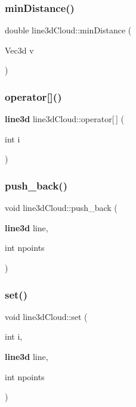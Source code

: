 \subsubsection{min\+Distance()\hspace{0.1cm}{\footnotesize\ttfamily [2/2]}}
{\footnotesize\ttfamily double line3d\+Cloud\+::min\+Distance (\begin{DoxyParamCaption}\item[{Vec3d}]{v }\end{DoxyParamCaption})}

\mbox{\label{classline3d_cloud_a12a7f0d2111300e83e47f9cf9f7a1e12}} 
\subsubsection{operator[]()}
{\footnotesize\ttfamily \textbf{ line3d} line3d\+Cloud\+::operator[$\,$] (\begin{DoxyParamCaption}\item[{int}]{i }\end{DoxyParamCaption})}

\mbox{\label{classline3d_cloud_a79885e87f85b3b14cfd9168f826a6d04}} 
\subsubsection{push\+\_\+back()}
{\footnotesize\ttfamily void line3d\+Cloud\+::push\+\_\+back (\begin{DoxyParamCaption}\item[{\textbf{ line3d}}]{line,  }\item[{int}]{npoints }\end{DoxyParamCaption})}

\mbox{\label{classline3d_cloud_a42347960ceed6c1bf04b1a2bff7a0370}} 
\subsubsection{set()}
{\footnotesize\ttfamily void line3d\+Cloud\+::set (\begin{DoxyParamCaption}\item[{int}]{i,  }\item[{\textbf{ line3d}}]{line,  }\item[{int}]{npoints }\end{DoxyParamCaption})}

